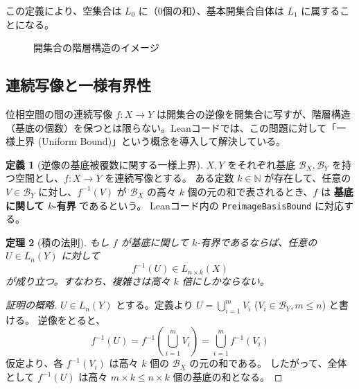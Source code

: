 \documentclass{ltjsarticle}
\theoremstyle{definition}
\newtheorem{definition}{定義}[section]
\theoremstyle{plain}
\newtheorem{theorem}[definition]{定理}
\begin{document}
この定義により、空集合は $L_0$ に（0個の和）、基本開集合自体は $L_1$ に属することになる。

\begin{figure}[htbp]
\centering
{}
\caption{開集合の階層構造のイメージ}
\end{figure}

\subsection{連続写像と一様有界性}

位相空間の間の連続写像 $f: X \to Y$ は開集合の逆像を開集合に写すが、階層構造（基底の個数）を保つとは限らない。Leanコードでは、この問題に対して「一様上界 (Uniform Bound)」という概念を導入して解決している。

\begin{definition}[逆像の基底被覆数に関する一様上界]
$X, Y$ をそれぞれ基底 $\mathcal{B}_X, \mathcal{B}_Y$ を持つ空間とし、$f: X \to Y$ を連続写像とする。
ある定数 $k \in \mathbb{N}$ が存在して、任意の $V \in \mathcal{B}_Y$ に対し、$f^{-1}(V)$ が $\mathcal{B}_X$ の高々 $k$ 個の元の和で表されるとき、$f$ は \textbf{基底に関して $k$-有界} であるという。
Leanコード内の \texttt{PreimageBasisBound} に対応する。
\end{definition}

\begin{theorem}[積の法則]
もし $f$ が基底に関して $k$-有界であるならば、任意の $U \in L_n(Y)$ に対して
\[
f^{-1}(U) \in L_{n \times k}(X)
\]
が成り立つ。すなわち、複雑さは高々 $k$ 倍にしかならない。
\end{theorem}

\begin{proof}[証明の概略]
$U \in L_n(Y)$ とする。定義より $U = \bigcup_{i=1}^m V_i$ ($V_i \in \mathcal{B}_Y, m \le n$) と書ける。
逆像をとると、
\[
f^{-1}(U) = f^{-1}\left(\bigcup_{i=1}^m V_i\right) = \bigcup_{i=1}^m f^{-1}(V_i)
\]
仮定より、各 $f^{-1}(V_i)$ は高々 $k$ 個の $\mathcal{B}_X$ の元の和である。
したがって、全体として $f^{-1}(U)$ は高々 $m \times k \le n \times k$ 個の基底の和となる。
\end{proof}
\end{document}
